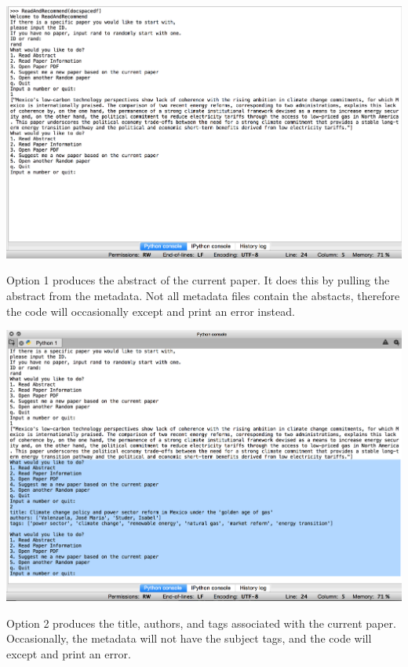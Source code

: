 \documentclass [12pt]{article}
\begin{document}
\begin{center}

\includegraphics[scale = .35]{sshot3}

\end{center}

Option 1 produces the abstract of the current paper. It does this by pulling the abstract from the metadata. Not all metadata files contain the abstacts, therefore the code will occasionally except and print an error instead. 

\begin{center}

\includegraphics[scale = .35]{sshot4}

\end{center}

Option 2 produces the title, authors, and tags associated with the current paper. Occasionally, the metadata will not have the subject tags, and the code will except and print an error. 
\end{document}
